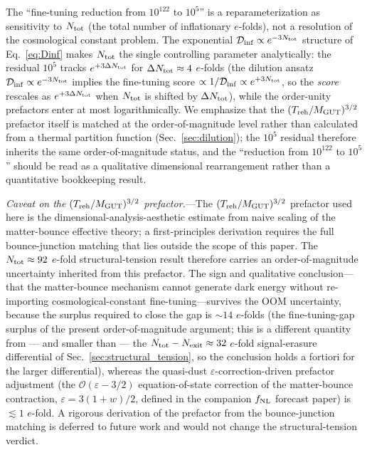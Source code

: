 \documentclass[aps,prd,twocolumn,superscriptaddress,showpacs,preprintnumbers,nofootinbib,longbibliography,floatfix]{revtex4-2}
\newcommand{\Dinf}{\mathcal{D}_{\rm inf}}
\begin{document}
The ``fine-tuning reduction from $10^{122}$ to $10^5$'' is a reparameterization
as sensitivity to $N_{\rm tot}$ (the total number of inflationary $e$-folds),
not a resolution of the cosmological constant problem. The exponential
$\Dinf \propto e^{-3 N_{\rm tot}}$ structure of Eq.~\eqref{eq:Dinf} makes
$N_{\rm tot}$ the single controlling parameter analytically: the residual
$10^5$ tracks $e^{+3 \Delta N_{\rm tot}}$ for $\Delta N_{\rm tot} \approx 4$
$e$-folds (the dilution ansatz $\Dinf \propto e^{-3 N_{\rm tot}}$ implies the
fine-tuning score $\propto 1/\Dinf \propto e^{+3 N_{\rm tot}}$, so the
\emph{score} rescales as $e^{+3\Delta N_{\rm tot}}$ when $N_{\rm tot}$ is
shifted by $\Delta N_{\rm tot}$), while the order-unity prefactors enter at most logarithmically.
We emphasize that the $(T_{\rm reh}/M_{\rm GUT})^{3/2}$ prefactor itself
is matched at the order-of-magnitude level rather than calculated from a
thermal partition function (Sec.~\ref{sec:dilution}); the $10^5$
residual therefore inherits the same order-of-magnitude status, and
the ``reduction from $10^{122}$ to $10^5$'' should be read as a
qualitative dimensional rearrangement rather than a quantitative
bookkeeping result.

\emph{Caveat on the $(T_{\rm reh}/M_{\rm GUT})^{3/2}$ prefactor.}---The
$(T_{\rm reh}/M_{\rm GUT})^{3/2}$ prefactor used here is the
dimensional-analysis-aesthetic estimate from naive scaling of the
matter-bounce effective theory; a first-principles derivation requires
the full bounce-junction matching that lies outside the scope of this
paper. The $N_{\rm tot}\approx 92$ $e$-fold structural-tension result
therefore carries an order-of-magnitude uncertainty inherited from this
prefactor. The sign and qualitative conclusion---that the matter-bounce
mechanism cannot generate dark energy without re-importing
cosmological-constant fine-tuning---survives the OOM uncertainty,
because the surplus required to close the gap is $\sim 14$ $e$-folds
(the fine-tuning-gap surplus of the present order-of-magnitude
argument; this is a different quantity from --- and smaller than ---
the $N_{\rm tot}-N_{\rm exit}\approx 32$ $e$-fold signal-erasure
differential of Sec.~\ref{sec:structural_tension}, so the conclusion
holds a fortiori for the larger differential),
whereas the quasi-dust $\varepsilon$-correction-driven prefactor
adjustment (the $\mathcal{O}(\varepsilon-3/2)$ equation-of-state
correction of the matter-bounce contraction, $\varepsilon = 3(1+w)/2$,
defined in the companion $f_{\rm NL}$ forecast paper) is
$\lesssim 1$ $e$-fold. A rigorous derivation of the prefactor from the
bounce-junction matching is deferred to future work and would not change
the structural-tension verdict.
\end{document}
